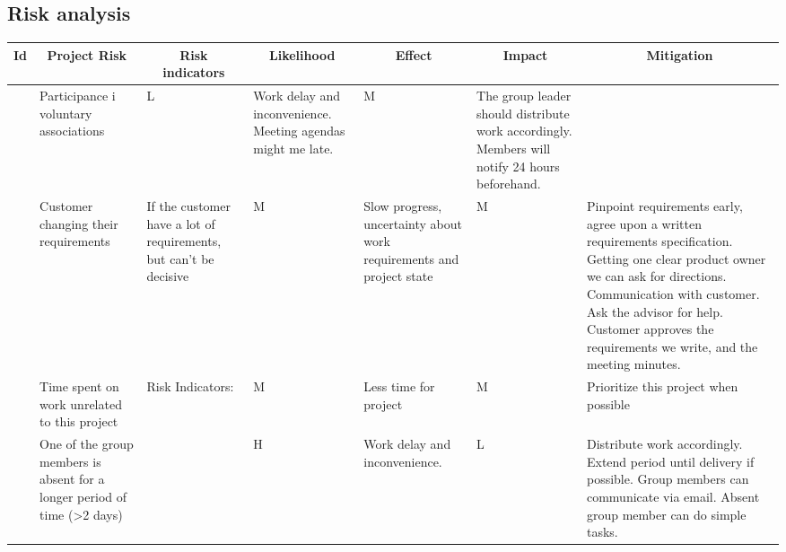 \begin{landscape}
\subsection{Risk analysis}

\centering
\begin{longtable}{| p{0.4cm} | p{4cm} | p{4cm} | p{2cm} | p{4cm} | p{1cm} | p{4cm} |}
	\hline
		\multicolumn{1}{|c|}{ Id}   &
        \multicolumn{1}{c|}{ Project Risk}  &
		\multicolumn{1}{c|}{ Risk indicators}  &
		\multicolumn{1}{c|}{ Likelihood} &
		\multicolumn{1}{c|}{ Effect} &
		\multicolumn{1}{c|}{ Impact} &
		\multicolumn{1}{c|}{ Mitigation} \\
		\hline \hline
	\endhead

	\newcounter{riskId}

	\stepcounter{riskId}
	\centering
		\arabic{riskId} &
        Participance i voluntary associations
		&
		\centering L &
		Work delay and inconvenience. Meeting agendas might me late. &
		\centering M &
		The group leader should distribute work accordingly. Members will notify 24 hours beforehand. \\
	\hline

	\stepcounter{riskId}
	\centering
		\arabic{riskId} &
        Customer changing their requirements &
		If the customer have a lot of requirements, but can’t be decisive &
		\centering M &
		Slow progress, uncertainty about work requirements and project state &
		\centering  M &
		Pinpoint requirements early, agree upon a written requirements
		specification. Getting one clear product owner we can ask for
		directions.  Communication with customer. Ask the advisor for help.
		Customer approves the requirements we write, and the meeting minutes.
		\\
	\hline

	\stepcounter{riskId}
	\centering
		\arabic{riskId} &
        Time spent on work unrelated to this project &
		Risk Indicators: &
		\centering M &
		Less time for project &
		\centering M & 
		Prioritize this project when possible \\
	\hline

	\stepcounter{riskId}
	\centering
		\arabic{riskId} &
        One of the group members is absent for a longer period of time (>2 days) &
		& \centering H &
		Work delay and inconvenience. &
		\centering  L &
		Distribute work accordingly. Extend period until delivery if possible.
		Group members can communicate via email. Absent group member can do
		simple tasks. \\
	\hline


\end{longtable}
\end{landscape}
